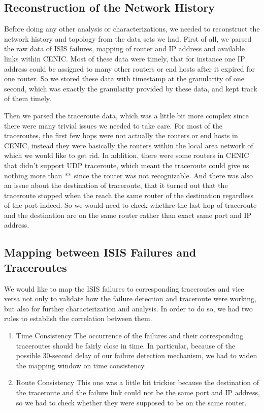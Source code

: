 \documentclass[conference, twocolumn, oneside, 10pt]{IEEEtran}
\begin{document}
\subsection{Reconstruction of the Network History}

Before doing any other analysis or characterizations, we needed to reconstruct the network history and topology from the data sets we had. First of all, we parsed the raw data of ISIS failures, mapping of router and IP address and available links within CENIC. Most of these data were timely, that for instance one IP address could be assigned to many other routers or end hosts after it expired for one router. So we stored these data with timestamp at the granularity of one second, which was exactly the granularity provided by these data, and kept track of them timely.

Then we parsed the traceroute data, which was a little bit more complex since there were many trivial issues we needed to take care. For most of the traceroutes, the first few hops were not actually the routers or end hosts in CENIC, instead they were basically the routers within the local area network of which we would like to get rid. In addition, there were some routers in CENIC that didn't support UDP traceroute, which meant the traceroute could give us nothing more than ** since the router was not recognizable. And there was also an issue about the destination of traceroute, that it turned out that the traceroute stopped when the reach the same router of the destination regardless of the port indeed. So we would need to check whethre the last hop of traceroute and the destination are on the same router rather than exact same port and IP address.

\subsection{Mapping between ISIS Failures and Traceroutes}

We would like to map the ISIS failures to corresponding traceroutes and vice versa not only to validate how the failure detection and traceroute were working, but also for further characterization and analysis. In order to do so, we had two rules to establish the correlation between them.

\begin{enumerate}

\item{Time Consistency} The occurrence of the failures and their corresponding traceroutes should be fairly close in time. In particular, because of the possible 30-second delay of our failure detection mechanism, we had to widen the mapping window on time consistency.

\item{Route Consistency} This one was a little bit trickier because the destination of the traceroute and the failure link could not be the same port and IP address, so we had to check whether they were supposed to be on the same router.

\end{enumerate}
\end{document}
